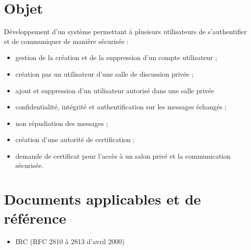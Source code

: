\documentclass[a4paper,11pt,french]{article}
\begin{document}
\clearpage
\tableofcontents
\clearpage

\section{Objet}
Développement d'un système permettant à plusieurs utilisateurs de s'authentifier et de communiquer de manière sécurisée :
\begin{itemize}
\item gestion de la création et de la suppression d'un compte utilisateur ;
\item création par un utilisateur d'une salle de discussion privée ;
\item ajout et suppression d'un utilisateur autorisé dans une salle privée
\item confidentialité, intégrité et authentification sur les messages échangés ;
\item non répudiation des messages ;
\item création d'une autorité de certification ;
\item demande de certificat pour l'accès à un salon privé et la communication sécurisée.
\end{itemize}

\section{Documents applicables et de référence}
\begin{itemize}
\item IRC (RFC 2810 à 2813 d'avril 2000)
\end{itemize}

\end{document}
